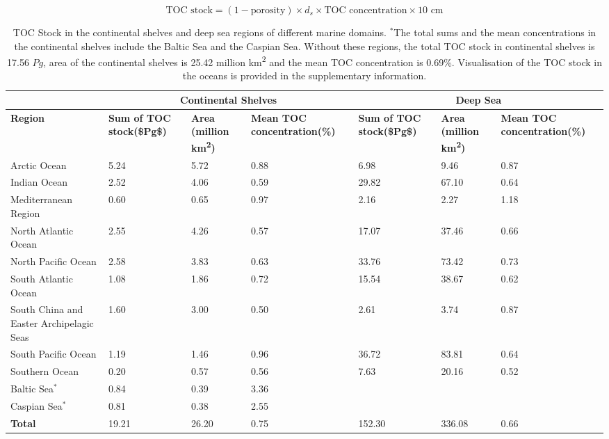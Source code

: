 \documentclass[journal abbreviation, manuscript]{copernicus}
\begin{document}
\begin{equation}
 \text{TOC stock} = (1 - \text{porosity}) \times d_s \times \text{TOC concentration} \times \text{10 cm}   
\end{equation}


\begin{table}[htbp]

\centering
\begin{tabular}{|p{}|p{}|p{}|p{}||p{}|p{}|p{}|}
\hline
& \multicolumn{3}{c||}{\textbf{Continental Shelves}} & \multicolumn{3}{c|}{\textbf{Deep Sea}} \\
\hline
\textbf{Region} & \textbf{Sum of TOC stock(\$Pg\$)} & \textbf{Area (million km\textsuperscript{2})} & \textbf{Mean TOC concentration(\%)} & \textbf{Sum of TOC stock(\$Pg\$)} & \textbf{Area (million km\textsuperscript{2})} & \textbf{Mean TOC concentration(\%)} \\
\hline
\hline
Arctic Ocean & 5.24& 5.72 & 0.88 & 6.98 & 9.46 & 0.87 \\
\hline
Indian Ocean & 2.52& 4.06 & 0.59 & 29.82 & 67.10 & 0.64 \\
\hline
Mediterranean Region & 0.60& 0.65 & 0.97 & 2.16 & 2.27 & 1.18 \\
\hline
North Atlantic Ocean & 2.55& 4.26 & 0.57 & 17.07 & 37.46 & 0.66 \\
\hline
North Pacific Ocean & 2.58& 3.83 & 0.63 & 33.76 & 73.42 & 0.73 \\
\hline
South Atlantic Ocean & 1.08& 1.86 & 0.72 & 15.54 & 38.67 & 0.62 \\
\hline
South China and Easter Archipelagic Seas & 1.60& 3.00 & 0.50 & 2.61 & 3.74 & 0.87 \\
\hline
South Pacific Ocean & 1.19& 1.46 & 0.96 & 36.72 & 83.81 & 0.64 \\
\hline
Southern Ocean & 0.20& 0.57 & 0.56 & 7.63 & 20.16 & 0.52 \\
\hline
Baltic Sea$^*$ & 0.84 & 0.39 & 3.36 & & & \\
\hline
Caspian Sea$^*$ & 0.81 & 0.38 & 2.55 & & & \\
\hline
\hline
\textbf{Total} & 19.21 & 26.20 & 0.75 & 152.30 & 336.08 & 0.66 \\
\hline
\end{tabular}
\caption{TOC Stock in the continental shelves and deep sea regions of different marine domains. $^*$The total sums and the mean concentrations in the continental shelves include the Baltic Sea and the Caspian Sea. Without these regions, the total TOC stock in continental shelves is 17.56 $Pg$, area of the continental shelves is 25.42 million km\textsuperscript{2} and the mean TOC concentration is 0.69\%. Visualisation of the TOC stock in the oceans is provided in the supplementary information.}
\label{tab:TOCStockOcean} 
\end{table}
\end{document}
